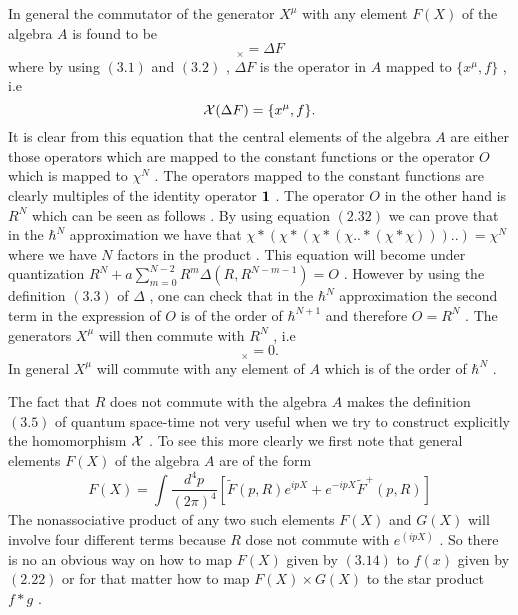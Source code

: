 \documentclass[a4paper,12pt]{article}
\begin{document}
In general the commutator of the generator $X^{\mu}$ with any element $F(X)$ of the algebra $A$ is found to be
\begin{equation}
[X^{\mu},F]_{\times}={\Delta}F
\end{equation}
where by using $(3.1)$ and $(3.2)$ , ${\Delta}F$ is the operator
in $A$ mapped to $\{x^{\mu},f\}$ , i.e
\begin{equation}
{\cal X}({\Delta}F)=\{x^{\mu},f\}.
\end{equation}
It is clear from this equation that the central elements of the
algebra $A$ are either those operators which are mapped to the
constant functions or the operator $O$ which is mapped to
${\chi}^N$ . The operators mapped to the constant functions are
clearly multiples of the identity operator ${\bf 1}$ . The
operator $O$ in the other hand is $R^N$ which can be seen as
follows . By using equation $(2.32)$ we can prove that in the
${\hbar}^N$ approximation we have that
${\chi}*({\chi}*({\chi}*({\chi}..*({\chi}*{\chi})))..)={\chi}^{N}$
where we have $N$ factors in the product . This equation will
become under quantization $R^N + a
\sum_{m=0}^{N-2}R^m{\Delta}(R,R^{N-m-1})=O$ . However by using
the definition $(3.3)$ of ${\Delta}$ , one can check that in the
${\hbar}^N$ approximation the second term in the expression of
$O$ is of the order of ${\hbar}^{N+1}$ and therefore $O=R^N$ .
The generators $X^{\mu}$ will then commute with $R^{N}$ , i.e
\begin{equation}
[X^{\mu},R^{N}]_{\times}=0.
\end{equation}
In general $X^{\mu}$ will commute with any element of $A$ which is of the order of ${\hbar}^N$ .

The fact that $R$ does not commute with the algebra $A$ makes the
definition $(3.5)$ of quantum space-time not very useful when we
try to construct explicitly the homomorphism ${\cal X}$ . To see
this more clearly we first note that general elements $F(X)$ of
the algebra $A$ are of the form
\begin{equation}
F(X)=\int \frac{d^4p}{(2{\pi})^4}[\tilde{F}(p,R) e^{ipX} +
e^{-ipX}\tilde{F}^{+}(p,R)]
\end{equation}
The nonassociative product of any two such elements $F(X)$ and
$G(X)$ will involve four different terms because $R$ dose not
commute with $e^{(ipX)}$ .
 So there is no an obvious way on how to map $F(X)$ given by $(3.14)$ to $f(x)$ given by
  $(2.22)$ or for that matter how to map $F(X){\times}G(X)$ to the star product $f*g$ .
\end{document}
